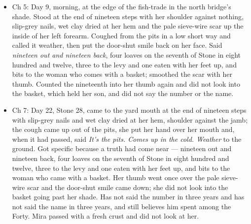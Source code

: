\documentclass{design/chronicle}
\begin{document}
{\begin{itemize}[leftmargin=1.4em,itemsep=1pt,topsep=3pt,parsep=0pt]
\end{itemize}

\begin{itemize}[leftmargin=1.4em,itemsep=1pt,topsep=3pt,parsep=0pt]

\item Ch 5: Day 9, morning, at the edge of the fish-trade in the north bridge’s shade. Stood at the end of nineteen steps with her shoulder against nothing, slip-grey nails, wet clay dried at her hem and the pale sieve-wire scar up the inside of her left forearm. Coughed from the pits in a low short way and called it weather, then put the door-shut smile back on her face. Said \emph{nineteen out and nineteen back}, four loaves on the seventh of Stone in eight hundred and twelve, three to the levy and one eaten with her feet up, and bits to the woman who comes with a basket; smoothed the scar with her thumb. Counted the nineteenth into her thumb again and did not look into the basket, which held her son, and did not say the number or the name.

\end{itemize}

\begin{itemize}[leftmargin=1.4em,itemsep=1pt,topsep=3pt,parsep=0pt]

\item Ch 7: Day 22, Stone 28, came to the yard mouth at the end of nineteen steps with slip-grey nails and wet clay dried at her hem, shoulder against the jamb; the cough came up out of the pits, she put her hand over her mouth and, when it had passed, said \emph{It’s the pits. Comes up in the cold. Weather} to the ground. Got specific because a truth had come near --- nineteen out and nineteen back, four loaves on the seventh of Stone in eight hundred and twelve, three to the levy and one eaten with her feet up, and bits to the woman who came with a basket. Her thumb went once over the pale sieve-wire scar and the door-shut smile came down; she did not look into the basket going past her shade. Has not said the number in three years and has not said the name in three years, and still believes him spent among the Forty. Mira passed with a fresh crust and did not look at her.

\end{itemize}

\begin{itemize}[leftmargin=1.4em,itemsep=1pt,topsep=3pt,parsep=0pt]


\end{itemize}}
\end{document}
